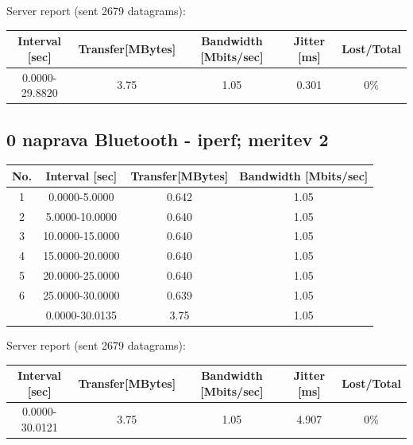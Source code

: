 \documentclass[11pt,a4paper,slovene]{article}
\begin{document}
Server report (sent 2679 datagrams):\\

\begin{table}[H]
	\begin{adjustwidth}{-3cm}{-3cm}
	\centering
		\begin{tabular}{c|c|c|c|c}
		\hline
		\textbf{Interval [sec]} & \textbf{Transfer[MBytes]} & \textbf{Bandwidth [Mbits/sec]} & \textbf{Jitter [ms]} & \textbf{Lost/Total}\\
     	\hline
     	0.0000-29.8820 & 3.75 & 1.05 & 0.301 & 0\%\\
  		\hline
    		\end{tabular}
    	\end{adjustwidth}
\end{table}

\subsection{0 naprava Bluetooth - iperf; meritev 2}

\begin{table}[H]
	\begin{adjustwidth}{-3cm}{-3cm}
	\centering
		\begin{tabular}{c|c|c|c}
		\hline
		\textbf{No.} & \textbf{Interval [sec]} & \textbf{Transfer[MBytes]} & \textbf{Bandwidth [Mbits/sec]}\\
     		\hline
     		1 & 0.0000-5.0000 & 0.642 & 1.05\\
  		2 & 5.0000-10.0000 & 0.640 & 1.05\\
  		3 & 10.0000-15.0000 & 0.640 & 1.05\\
  		4 & 15.0000-20.0000 & 0.640 & 1.05\\
  		5 & 20.0000-25.0000 & 0.640 & 1.05\\
  		6 & 25.0000-30.0000 & 0.639 & 1.05\\
  		\hline
  		& 0.0000-30.0135 & 3.75 & 1.05\\
  		\hline
    		\end{tabular}
    	\end{adjustwidth}
\end{table}

Server report (sent 2679 datagrams):\\

\begin{table}[H]
	\begin{adjustwidth}{-3cm}{-3cm}
	\centering
		\begin{tabular}{c|c|c|c|c}
		\hline
		\textbf{Interval [sec]} & \textbf{Transfer[MBytes]} & \textbf{Bandwidth [Mbits/sec]} & \textbf{Jitter [ms]} & \textbf{Lost/Total}\\
     	\hline
     	0.0000-30.0121 & 3.75 & 1.05 & 4.907 & 0\%\\
  		\hline
    		\end{tabular}
    	\end{adjustwidth}
\end{table}
\end{document}
